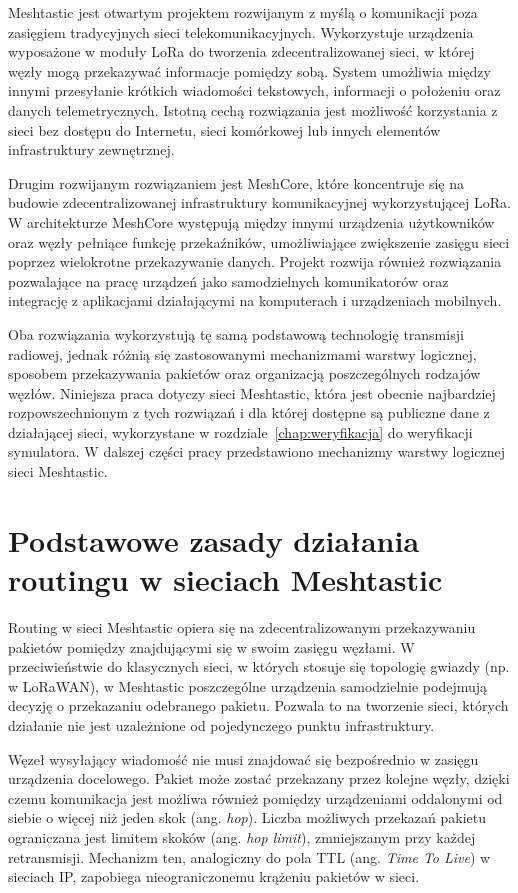 \documentclass[12pt,a4paper,twoside]{report}
\theoremstyle{definition} %
\begin{document}
    Meshtastic jest otwartym projektem rozwijanym z myślą o komunikacji poza zasięgiem tradycyjnych sieci telekomunikacyjnych. Wykorzystuje urządzenia wyposażone w moduły LoRa do tworzenia zdecentralizowanej sieci, w której węzły mogą przekazywać informacje pomiędzy sobą. System umożliwia między innymi przesyłanie krótkich wiadomości tekstowych, informacji o położeniu oraz danych telemetrycznych. Istotną cechą rozwiązania jest możliwość korzystania z sieci bez dostępu do Internetu, sieci komórkowej lub innych elementów infrastruktury zewnętrznej.
    
    Drugim rozwijanym rozwiązaniem jest MeshCore, które koncentruje się na budowie zdecentralizowanej infrastruktury komunikacyjnej wykorzystującej LoRa. W architekturze MeshCore występują między innymi urządzenia użytkowników oraz węzły pełniące funkcję przekaźników, umożliwiające zwiększenie zasięgu sieci poprzez wielokrotne przekazywanie danych. Projekt rozwija również rozwiązania pozwalające na pracę urządzeń jako samodzielnych komunikatorów oraz integrację z aplikacjami działającymi na komputerach i urządzeniach mobilnych.
    
    Oba rozwiązania wykorzystują tę samą podstawową technologię transmisji radiowej, jednak różnią się zastosowanymi mechanizmami warstwy logicznej, sposobem przekazywania pakietów oraz organizacją poszczególnych rodzajów węzłów. Niniejsza praca dotyczy sieci Meshtastic, która jest obecnie najbardziej rozpowszechnionym z tych rozwiązań i dla której dostępne są publiczne dane z działającej sieci, wykorzystane w rozdziale~\ref{chap:weryfikacja} do weryfikacji symulatora. W dalszej części pracy przedstawiono mechanizmy warstwy logicznej sieci Meshtastic.
    
    \section{Podstawowe zasady działania routingu w sieciach Meshtastic}

    Routing w sieci Meshtastic opiera się na zdecentralizowanym przekazywaniu pakietów pomiędzy znajdującymi się w swoim zasięgu węzłami. W przeciwieństwie do klasycznych sieci, w których stosuje się topologię gwiazdy (np. w LoRaWAN), w Meshtastic poszczególne urządzenia samodzielnie podejmują decyzję o przekazaniu odebranego pakietu. Pozwala to na tworzenie sieci, których działanie nie jest uzależnione od pojedynczego punktu infrastruktury.
    
    Węzeł wysyłający wiadomość nie musi znajdować się bezpośrednio w zasięgu urządzenia docelowego. Pakiet może zostać przekazany przez kolejne węzły, dzięki czemu komunikacja jest możliwa również pomiędzy urządzeniami oddalonymi od siebie o więcej niż jeden skok (ang. \textit{hop}). Liczba możliwych przekazań pakietu ograniczana jest limitem skoków (ang. \textit{hop limit}), zmniejszanym przy każdej retransmisji. Mechanizm ten, analogiczny do pola TTL (ang. \textit{Time To Live}) w sieciach IP, zapobiega nieograniczonemu krążeniu pakietów w sieci.
    
\end{document}
